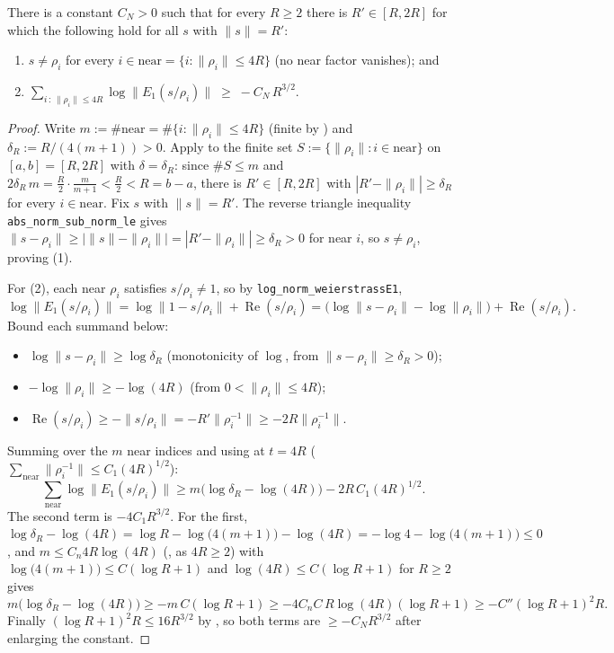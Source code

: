 \begin{lemma}
\label{lem:cm_near_lower}
\leanok
{}
There is a constant $C_N>0$ such that for every $R\ge2$ there is $R'\in[R,2R]$ for which the
following hold for all $s$ with $\|s\|=R'$:
\begin{enumerate}
\item $s\neq\rho_i$ for every $i\in\mathrm{near}=\{i:\|\rho_i\|\le4R\}$ (no near factor vanishes); and
\item $\displaystyle\sum_{i\,:\,\|\rho_i\|\le4R}\log\|E_1(s/\rho_i)\|\;\ge\;-C_N\,R^{3/2}.$
\end{enumerate}
\end{lemma}

\begin{proof}
\leanok
{}
Write $m:=\#\mathrm{near}=\#\{i:\|\rho_i\|\le4R\}$ (finite by ) and
$\delta_R:=R/(4(m+1))>0$. Apply  to the finite set
$S:=\{\|\rho_i\|:i\in\mathrm{near}\}$ on $[a,b]=[R,2R]$ with $\delta=\delta_R$: since
$\#S\le m$ and $2\delta_R\,m=\tfrac{R}{2}\cdot\tfrac{m}{m+1}<\tfrac R2<R=b-a$, there is
$R'\in[R,2R]$ with $|R'-\|\rho_i\||\ge\delta_R$ for every $i\in\mathrm{near}$. Fix $s$ with
$\|s\|=R'$. The reverse triangle inequality \texttt{abs\_norm\_sub\_norm\_le} gives
$\|s-\rho_i\|\ge\bigl|\|s\|-\|\rho_i\|\bigr|=|R'-\|\rho_i\||\ge\delta_R>0$ for near $i$, so
$s\neq\rho_i$, proving (1).

For (2), each near $\rho_i$ satisfies $s/\rho_i\neq1$, so by \texttt{log\_norm\_weierstrassE1},
\[
  \log\|E_1(s/\rho_i)\|=\log\|1-s/\rho_i\|+\operatorname{Re}(s/\rho_i)
   =\bigl(\log\|s-\rho_i\|-\log\|\rho_i\|\bigr)+\operatorname{Re}(s/\rho_i).
\]
Bound each summand below:
\begin{itemize}
\item $\log\|s-\rho_i\|\ge\log\delta_R$ (monotonicity of $\log$, from $\|s-\rho_i\|\ge\delta_R>0$);
\item $-\log\|\rho_i\|\ge-\log(4R)$ (from $0<\|\rho_i\|\le4R$);
\item $\operatorname{Re}(s/\rho_i)\ge-\|s/\rho_i\|=-R'\|\rho_i^{-1}\|\ge-2R\|\rho_i^{-1}\|$.
\end{itemize}
Summing over the $m$ near indices and using  at $t=4R$
($\sum_{\mathrm{near}}\|\rho_i^{-1}\|\le C_1(4R)^{1/2}$):
\[
  \sum_{\mathrm{near}}\log\|E_1(s/\rho_i)\|
   \ge m\bigl(\log\delta_R-\log(4R)\bigr)-2R\,C_1(4R)^{1/2}.
\]
The second term is $-4C_1R^{3/2}$. For the first,
$\log\delta_R-\log(4R)=\log R-\log\bigl(4(m+1)\bigr)-\log(4R)=-\log4-\log\bigl(4(m+1)\bigr)\le0$,
and $m\le C_n4R\log(4R)$ (, as $4R\ge2$) with
$\log\bigl(4(m+1)\bigr)\le C(\log R+1)$ and $\log(4R)\le C(\log R+1)$ for $R\ge2$ gives
\[
  m\bigl(\log\delta_R-\log(4R)\bigr)\ge-m\,C(\log R+1)\ge-4C_nC\,R\log(4R)(\log R+1)
   \ge-C''(\log R+1)^{2}R.
\]
Finally $(\log R+1)^{2}R\le16R^{3/2}$ by , so both terms are
$\ge-C_NR^{3/2}$ after enlarging the constant.
\end{proof}


